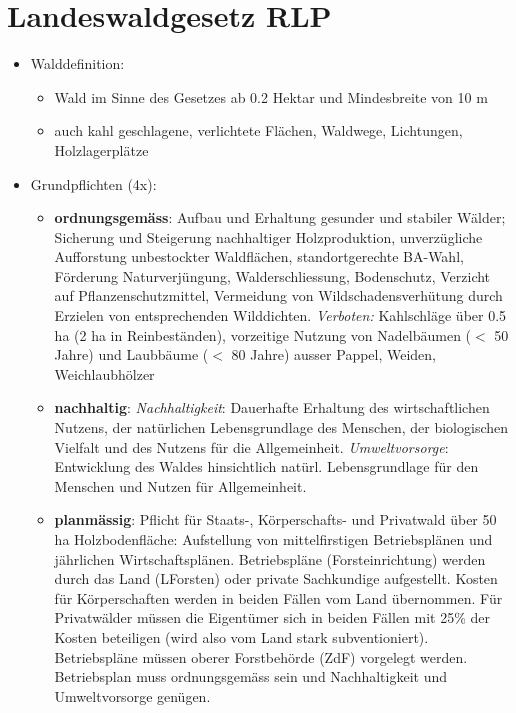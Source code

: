 \documentclass{article}
\begin{document}
\newpage
\section{Landeswaldgesetz RLP}

\begin{itemize}

	\item Walddefinition:
	
		\begin{itemize}
		  \item Wald im Sinne des Gesetzes ab 0.2 Hektar und Mindesbreite von 10 m
		  \item auch kahl geschlagene, verlichtete Flächen, Waldwege, Lichtungen, Holzlagerplätze
		\end{itemize}


	\item Grundpflichten (4x): 
	
		\begin{itemize}
			
			\item \textbf{ordnungsgemäss}: Aufbau und Erhaltung gesunder und stabiler Wälder; Sicherung und Steigerung nachhaltiger Holzproduktion, unverzügliche Aufforstung unbestockter Waldflächen, standortgerechte BA-Wahl, Förderung Naturverjüngung, Walderschliessung, Bodenschutz, Verzicht auf Pflanzenschutzmittel, Vermeidung von Wildschadensverhütung durch Erzielen von entsprechenden Wilddichten. \textit{Verboten:} Kahlschläge über 0.5 ha (2 ha in Reinbeständen), vorzeitige Nutzung von Nadelbäumen ($<$ 50 Jahre) und Laubbäume ($<$ 80 Jahre) ausser Pappel, Weiden, Weichlaubhölzer
			
			\item \textbf{nachhaltig}: \textit{Nachhaltigkeit}: Dauerhafte Erhaltung des wirtschaftlichen Nutzens, der natürlichen Lebensgrundlage des Menschen, der biologischen Vielfalt und des Nutzens für die Allgemeinheit. \textit{Umweltvorsorge}: Entwicklung des Waldes hinsichtlich natürl. Lebensgrundlage für den Menschen und Nutzen für Allgemeinheit.
			
			\item \textbf{planmässig}: Pflicht für Staats-, Körperschafts- und Privatwald über 50 ha Holzbodenfläche: Aufstellung von mittelfirstigen Betriebsplänen und jährlichen Wirtschaftsplänen. Betriebspläne (Forsteinrichtung) werden durch das Land (LForsten) oder private Sachkundige aufgestellt. Kosten für Körperschaften werden in beiden Fällen vom Land übernommen. Für Privatwälder müssen die Eigentümer sich in beiden Fällen mit 25\% der Kosten beteiligen (wird also vom Land stark subventioniert). Betriebspläne müssen oberer Forstbehörde (ZdF) vorgelegt werden. Betriebsplan muss ordnungsgemäss sein und Nachhaltigkeit und Umweltvorsorge genügen.
			

\end{itemize}
\end{itemize}
\end{document}
